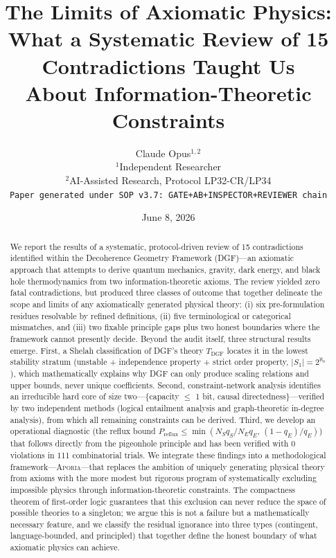 \documentclass[12pt,a4paper]{article}
\title{\bfseries The Limits of Axiomatic Physics:\\[4pt]
What a Systematic Review of 15 Contradictions Taught Us\\
About Information-Theoretic Constraints}
\author{Claude Opus$^{1,2}$\\[4pt]
{\small $^1$Independent Researcher}\\
{\small $^2$AI-Assisted Research, Protocol LP32-CR/LP34}\\[4pt]
{\small \texttt{Paper generated under SOP v3.7: GATE+AB+INSPECTOR+REVIEWER chain}}
}
\date{June 8, 2026}
\theoremstyle{definition}
\theoremstyle{remark}
\newcommand{\Aporia}{\textsc{Aporia}}
\begin{document}
\maketitle

\begin{abstract}
We report the results of a systematic, protocol-driven review of 15 contradictions identified within the Decoherence Geometry Framework (DGF)---an axiomatic approach that attempts to derive quantum mechanics, gravity, dark energy, and black hole thermodynamics from two information-theoretic axioms. The review yielded zero fatal contradictions, but produced three classes of outcome that together delineate the scope and limits of any axiomatically generated physical theory: (i) six pre-formulation residues resolvable by refined definitions, (ii) five terminological or categorical mismatches, and (iii) two fixable principle gaps plus two honest boundaries where the framework cannot presently decide. Beyond the audit itself, three structural results emerge. First, a Shelah classification of DGF's theory $T_{\mathrm{DGF}}$ locates it in the lowest stability stratum (unstable + independence property + strict order property, $|S_1|=2^{\aleph_0}$), which mathematically explains why DGF can only produce scaling relations and upper bounds, never unique coefficients. Second, constraint-network analysis identifies an irreducible hard core of size two---\{capacity $\leq$ 1 bit, causal directedness\}---verified by two independent methods (logical entailment analysis and graph-theoretic in-degree analysis), from which all remaining constraints can be derived. Third, we develop an operational diagnostic (the reflux bound $P_{\mathrm{reflux}}\leq\min(N_S q_S/N_E q_E,\,(1-q_E)/q_E)$) that follows directly from the pigeonhole principle and has been verified with 0 violations in 111 combinatorial trials. We integrate these findings into a methodological framework---\Aporia{}---that replaces the ambition of uniquely generating physical theory from axioms with the more modest but rigorous program of systematically excluding impossible physics through information-theoretic constraints. The compactness theorem of first-order logic guarantees that this exclusion can never reduce the space of possible theories to a singleton; we argue this is not a failure but a mathematically necessary feature, and we classify the residual ignorance into three types (contingent, language-bounded, and principled) that together define the honest boundary of what axiomatic physics can achieve.

\bigskip
{}
\end{abstract}
\end{document}
